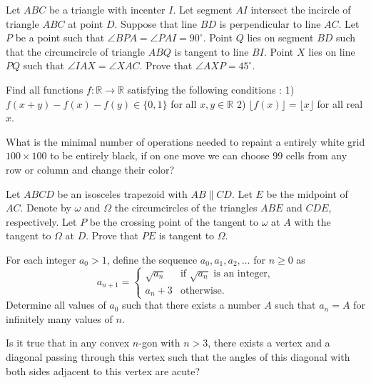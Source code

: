 \documentclass[11pt]{scrartcl}
\begin{document}
\begin{problem}[548248988934632]
Let $ABC$ be a triangle with incenter $I$. Let segment $AI$ intersect the incircle of triangle $ABC$ at point $D$. Suppose that line $BD$ is perpendicular to line $AC$. Let $P$ be a point such that $\angle BPA = \angle PAI = 90^\circ$. Point $Q$ lies on segment $BD$ such that the circumcircle of triangle $ABQ$ is tangent to line $BI$. Point $X$ lies on line $PQ$ such that $\angle IAX = \angle XAC$. Prove that $\angle AXP = 45^\circ$.
\end{problem}
\begin{problem}[549237375256018]
Find all functions $f : \mathbb{R} \rightarrow \mathbb{R}$ satisfying the following conditions :
1) $f(x+y)-f(x)-f(y) \in \{0,1\} $ for all $x,y \in \mathbb{R}$
2) $\lfloor f(x) \rfloor = \lfloor x \rfloor $ for all real $x$.
\end{problem}
\begin{problem}[549441013338848]
	What is the minimal number of operations needed to repaint a entirely white grid $100 \times 100$ to be entirely black, if on one move we can choose $99$ cells from any row or column and change their color?
\end{problem}
\begin{problem}[551619066390682]
Let $ABCD$ be an isosceles trapezoid with $AB\parallel CD$. Let $E$ be the midpoint of $AC$. Denote by $\omega$ and $\Omega$ the circumcircles of the triangles $ABE$ and $CDE$, respectively. Let $P$ be the crossing point of the tangent to $\omega$ at $A$ with the tangent to $\Omega$ at $D$. Prove that $PE$ is tangent to $\Omega$.
\end{problem}
\begin{problem}[552612087321706]
For each integer $a_0 > 1$, define the sequence $a_0, a_1, a_2, \ldots$ for $n \geq 0$ as
$$a_{n+1} = 
\begin{cases}
\sqrt{a_n} & \text{if } \sqrt{a_n} \text{ is an integer,} \\
a_n + 3 & \text{otherwise.}
\end{cases}
$$Determine all values of $a_0$ such that there exists a number $A$ such that $a_n = A$ for infinitely many values of $n$.
\end{problem}
\begin{problem}[552933284268039]
	Is it true that in any convex $n$-gon with $n > 3$, there exists a vertex and a diagonal passing through this vertex such that the angles of this diagonal with both sides adjacent to this vertex are acute?
\end{problem}
\end{document}
